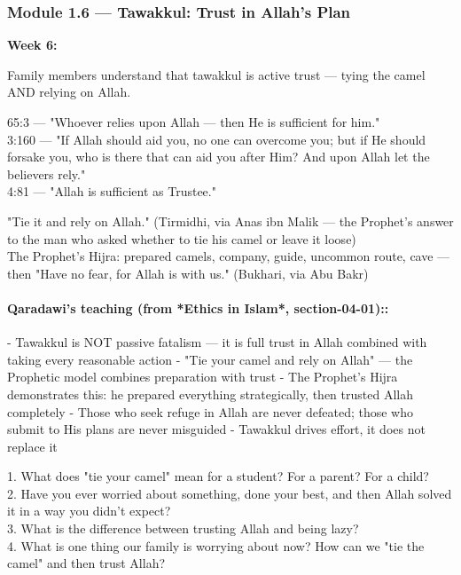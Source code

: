 \documentclass[11pt,a4paper]{article}
\begin{document}
\vspace{6pt}\noindent{\color{border}\rule{\textwidth}{0.5pt}}\vspace{6pt}

\subsubsection*{Module 1.6 --- Tawakkul: Trust in Allah's Plan}
\textbf{Week 6:} 

\begin{outcomebox} Family members understand that tawakkul is active trust --- tying the camel AND relying on Allah. \end{outcomebox}

\begin{quranbox} 65:3 --- "Whoever relies upon Allah --- then He is sufficient for him." \\ 3:160 --- "If Allah should aid you, no one can overcome you; but if He should forsake you, who is there that can aid you after Him? And upon Allah let the believers rely." \\ 4:81 --- "Allah is sufficient as Trustee." \end{quranbox}

\begin{hadithbox} "Tie it and rely on Allah." (Tirmidhi, via Anas ibn Malik --- the Prophet's answer to the man who asked whether to tie his camel or leave it loose) \\ The Prophet's Hijra: prepared camels, company, guide, uncommon route, cave --- then "Have no fear, for Allah is with us." (Bukhari, via Abu Bakr) \end{hadithbox}

\paragraph*{Qaradawi's teaching (from *Ethics in Islam*, section-04-01)::}  - Tawakkul is NOT passive fatalism --- it is full trust in Allah combined with taking every reasonable action - "Tie your camel and rely on Allah" --- the Prophetic model combines preparation with trust - The Prophet's Hijra demonstrates this: he prepared everything strategically, then trusted Allah completely - Those who seek refuge in Allah are never defeated; those who submit to His plans are never misguided - Tawakkul drives effort, it does not replace it

\begin{discussionbox} 1. What does "tie your camel" mean for a student? For a parent? For a child? \\ 2. Have you ever worried about something, done your best, and then Allah solved it in a way you didn't expect? \\ 3. What is the difference between trusting Allah and being lazy? \\ 4. What is one thing our family is worrying about now? How can we "tie the camel" and then trust Allah? \end{discussionbox}
\end{document}
